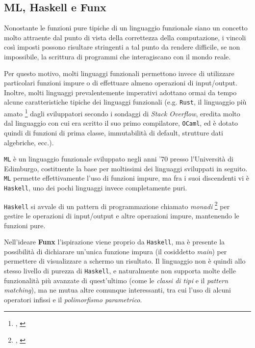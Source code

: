 \subsection{ML, Haskell e Funx}
\label{sec:2-2-ml-haskell-funx}

Nonostante le funzioni pure tipiche di un linguaggio funzionale siano un concetto molto attraente
dal punto di vista della correttezza della computazione, i vincoli così imposti possono risultare
stringenti a tal punto da rendere difficile, se non impossibile, la scrittura di programmi che
interagiscano con il mondo reale.


Per questo motivo, molti linguaggi funzionali permettono invece di utilizzare particolari funzioni
impure o di effettuare almeno operazioni di input/output. Inoltre, molti linguaggi prevalentemente
imperativi adottano ormai da tempo alcune caratteristiche tipiche dei linguaggi funzionali
(e.g. \texttt{Rust}, il linguaggio più amato%
\footnote{, \cite{Overflow-2023-DeveloperSurvey}}
dagli sviluppatori secondo i sondaggi di \textit{Stack Overflow},
eredita molto dal linguaggio con cui era scritto il suo primo compilatore, \texttt{OCaml}, ed è dotato quindi di
funzioni di prima classe, immutabilità di default, strutture dati algebriche, ecc.).


\texttt{ML} è un linguaggio funzionale sviluppato negli anni '70 presso l'Università di Edimburgo,
costituente la base per moltissimi dei linguaggi sviluppati in seguito.
\texttt{ML} permette effettivamente l'uso di funzioni impure, ma fra i suoi discendenti
vi è \texttt{Haskell}, uno dei pochi linguaggi invece completamente puri.

\noindent \texttt{Haskell} si avvale di un pattern di programmazione chiamato \textit{monadi}%
\footnote{, \cite{Moggi-1991-ComputationMonads}} per gestire
le operazioni di input/output e altre operazioni impure, mantenendo le funzioni pure.


Nell'ideare \textbf{Funx} l'ispirazione viene proprio da \texttt{Haskell}, ma è presente la possibilità
di dichiarare un'unica funzione impura (il cosiddetto \textit{main}) per permettere di visualizzare a schermo un risultato.
Il linguaggio non è quindi allo stesso livello di purezza di \texttt{Haskell}, e naturalmente non supporta
molte delle funzionalità più avanzate di quest'ultimo (come le \textit{classi di tipi} e il \textit{pattern matching}),
ma ne mutua altre comunque interessanti, tra cui l'uso di alcuni operatori infissi e il \textit{polimorfismo parametrico}.